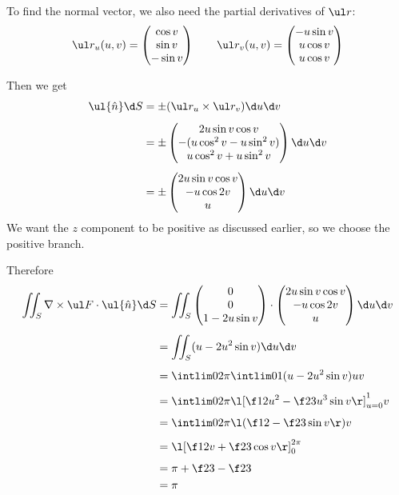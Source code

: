 \documentclass[a4paper]{article}
\begin{document}
To find the normal vector, we also need the partial derivatives of $\ul r$: $$\ul r_u(u, v) = \begin{pmatrix} \cos v \\ \sin v \\ - \sin v \end{pmatrix} \qquad \ul r_v(u, v) = \begin{pmatrix} -u \sin v \\ u \cos v \\ u \cos v \end{pmatrix}$$

Then we get \begin{align*}
\ul{\hat n} \d S &= \pm (\ul r_u \times \ul r_v) \d u \d v \\[1ex]
&= \pm \begin{pmatrix} 2u \sin v \cos v \\ -(u \cos^2 v - u \sin^2 v) \\ u \cos^2 v + u \sin^2 v \end{pmatrix} \d u \d v \\[1ex]
&= \pm \begin{pmatrix} 2u \sin v \cos v \\ -u \cos 2v \\ u \end{pmatrix} \d u \d v
\end{align*}
We want the $z$ component to be positive as discussed earlier, so we choose the positive branch.

Therefore \begin{align*}
\iint_S \nabla \times \ul F \cdot \ul{\hat n} \d S &= \iint_S \begin{pmatrix} 0 \\ 0 \\ 1 - 2u \sin v \end{pmatrix} \cdot \begin{pmatrix} 2u \sin v \cos v \\ -u \cos 2v \\ u \end{pmatrix} \d u \d v \\[1ex]
&= \iint_S (u - 2 u^2 \sin v) \d u \d v \\[1ex]
&= \intlim 0{2\pi} {\intlim 01 {(u - 2 u^2 \sin v)} u} v \\[1ex]
&= \intlim 0{2\pi} {\l[ \f12 u^2 - \f23 u^3 \sin v \r]_{u=0}^1} v \\[1ex]
&= \intlim 0{2\pi} {\l( \f12 - \f23 \sin v \r)} v \\[1ex]
&= \l[ \f12 v + \f23 \cos v \r]_0^{2\pi} \\[1ex]
&= \pi + \f23 - \f23 \\
&= \pi
\end{align*}
\end{document}
